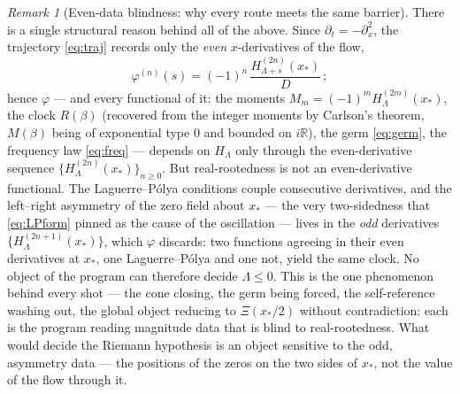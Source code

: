 \documentclass[11pt,reqno]{amsart}
\theoremstyle{plain}
\theoremstyle{definition}
\theoremstyle{remark}
\newtheorem{remark}[theorem]{Remark}
\newcommand{\R}{\mathbb R}
\begin{document}
\begin{remark}[Even-data blindness: why every route meets the same barrier]
\label{rem:blind}
There is a single structural reason behind all of the above. Since
$\partial_t=-\partial_x^2$, the trajectory \eqref{eq:traj} records only the
\emph{even} $x$-derivatives of the flow,
\begin{equation}\label{eq:evenonly}
  \varphi^{(n)}(s)=(-1)^n\,\frac{H_{\Lambda+s}^{(2n)}(x_*)}{D}\,;
\end{equation}
hence $\varphi$ --- and every functional of it: the moments
$M_m=(-1)^mH_\Lambda^{(2m)}(x_*)$, the clock $R(\beta)$ (recovered from the
integer moments by Carlson's theorem, $M(\beta)$ being of exponential type
$0$ and bounded on $i\R$), the germ \eqref{eq:germ}, the frequency law
\eqref{eq:freq} --- depends on $H_\Lambda$ only through the even-derivative
sequence $\{H_\Lambda^{(2n)}(x_*)\}_{n\ge0}$. But real-rootedness is not an
even-derivative functional. The Laguerre--P\'olya conditions couple
consecutive derivatives, and the left--right asymmetry of the zero field
about $x_*$ --- the very two-sidedness that \eqref{eq:LPform} pinned as the
cause of the oscillation --- lives in the \emph{odd} derivatives
$\{H_\Lambda^{(2n+1)}(x_*)\}$, which $\varphi$ discards: two functions
agreeing in their even derivatives at $x_*$, one Laguerre--P\'olya and one
not, yield the same clock. No object of the program can therefore decide
$\Lambda\le0$. This is the one phenomenon behind every shot --- the cone
closing, the germ being forced, the self-reference washing out, the global
object reducing to $\Xi(x_*/2)$ without contradiction: each is the program
reading magnitude data that is blind to real-rootedness. What would decide
the Riemann hypothesis is an object sensitive to the odd, asymmetry data ---
the positions of the zeros on the two sides of $x_*$, not the value of the
flow through it.
\end{remark}
\end{document}
